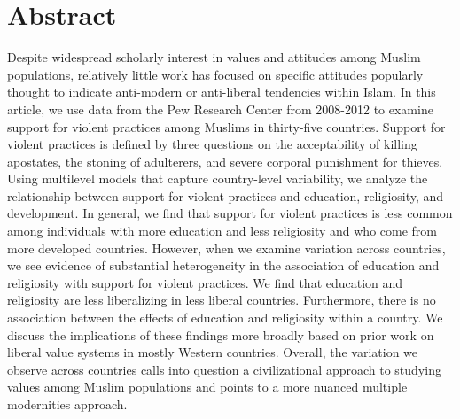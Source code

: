 \documentclass[10pt,letterpaper]{article}
\begin{document}
\section*{Abstract}
Despite widespread scholarly interest in values and attitudes among
Muslim populations, relatively little work has focused on specific
attitudes popularly thought to indicate anti-modern or anti-liberal
tendencies within Islam. In this article, we use data from the Pew
Research Center from 2008-2012 to examine support for violent practices
among Muslims in thirty-five countries. Support for violent practices is
defined by three questions on the acceptability of killing apostates,
the stoning of adulterers, and severe corporal punishment for thieves.
Using multilevel models that capture country-level variability, we
analyze the relationship between support for violent practices and
education, religiosity, and development. In general, we find that
support for violent practices is less common among individuals with more
education and less religiosity and who come from more developed
countries. However, when we examine variation across countries, we see
evidence of substantial heterogeneity in the association of education
and religiosity with support for violent practices. We find that
education and religiosity are less liberalizing in less liberal
countries. Furthermore, there is no association between the effects of
education and religiosity within a country. We discuss the implications
of these findings more broadly based on prior work on liberal value
systems in mostly Western countries. Overall, the variation we observe
across countries calls into question a civilizational approach to
studying values among Muslim populations and points to a more nuanced
multiple modernities approach.

\end{document}

